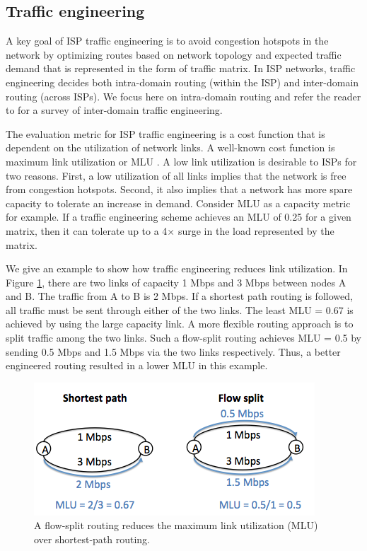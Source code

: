 \subsection{Traffic engineering}
\label{sec:ch2-te}

A key goal of ISP traffic engineering is to avoid congestion hotspots in the network by optimizing routes based on network topology and expected traffic demand that is represented in the form of traffic matrix. In ISP networks, traffic engineering decides both intra-domain routing (within the ISP) and inter-domain routing (across ISPs). We focus here on intra-domain routing and refer the reader to  \cite{Feamster2003,rexford} for a survey of inter-domain traffic engineering. 

The evaluation metric for ISP traffic engineering is a cost function that is dependent on the utilization of network links. A well-known cost function is maximum link utilization or MLU \cite{rexford, COPE}. A low link utilization is desirable to ISPs for two reasons. First, a low utilization of all links implies that the network is free from congestion hotspots. Second, it also implies that a network has more spare capacity to tolerate an increase in demand. Consider MLU as a capacity metric for example. If a traffic engineering scheme achieves an MLU of 0.25 for a given matrix, then it can tolerate up to a 4$\times$ surge in the load represented by the matrix.

We give an example to show how traffic engineering reduces link utilization. In Figure \ref{fig:te-example}, there are two links of capacity 1 Mbps and 3 Mbps between nodes A and B. The traffic from A to B is 2 Mbps. If a shortest path routing is followed, all traffic must be sent through either of the two links. The least MLU = 0.67 is achieved by using the large capacity link. A more flexible routing approach is to split traffic among the two links. Such a flow-split routing achieves MLU = 0.5 by sending 0.5 Mbps and 1.5 Mbps via the two links respectively. Thus, a better engineered routing resulted in a lower MLU in this example.

\begin{figure}
	\centering
	\includegraphics[scale=0.6]{fig/te-example.png}
	\caption{A flow-split routing reduces the maximum link utilization (MLU) over shortest-path routing.}
	\label{fig:te-example}
\end{figure}



